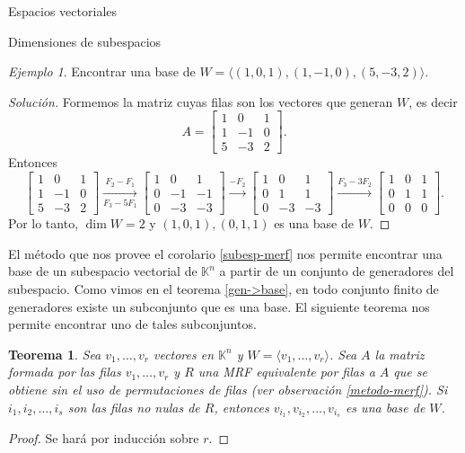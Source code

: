 \documentclass[a4paper,12pt,twoside,spanish,reqno]{amsbook}
\numberwithin{equation}{section}
\newtheorem{teorema}{Teorema}[section]
\theoremstyle{definition}
\theoremstyle{remark}
\newtheorem*{ejemplo*}{Ejemplo}
\newcommand{\K}{\mathbb K}
\begin{document}
\begin{chapter}{Espacios vectoriales}
\begin{section}{Dimensiones de subespacios}
    \begin{ejemplo*}\label{ej-4.5}
        Encontrar una base  de $W= \langle (1,0,1), (1,-1,0), (5,-3,2)\rangle$. 
    \end{ejemplo*}
    \begin{proof}[Solución]
        Formemos la matriz cuyas filas son los vectores que generan $W$,  es decir 
        $$
        A = \begin{bmatrix} 1&0&1 \\ 1&-1&0 \\ 5&-3&2 \end{bmatrix}.
        $$
        Entonces
        \begin{equation*}
        \begin{bmatrix}1&0&1 \\ 1&-1&0 \\ 5&-3&2  \end{bmatrix}
        \underset{F_3-5F_1}{\stackrel{F_2- F_1}{\longrightarrow}} 
        \begin{bmatrix}1&0&1 \\ 0&-1&-1 \\ 0&-3&-3\end{bmatrix}
        \stackrel{-F_2}{\longrightarrow} 
        \begin{bmatrix}1&0&1 \\ 0&1&1 \\ 0&-3&-3\end{bmatrix}
        \stackrel{F_3 - 3F_2}{\longrightarrow}
        \begin{bmatrix}1&0&1 \\ 0&1&1 \\ 0&0&0\end{bmatrix}.
        \end{equation*}
        Por lo tanto, $\dim W =2$ y $(1,0,1), (0,1,1)$ es una base de  $W$.
    \end{proof}
    
    El método que nos provee el corolario  \ref{subesp-merf} nos permite encontrar una base de un subespacio vectorial de $\K^n$ a partir de un conjunto de generadores del subespacio. Como vimos en el teorema \ref{gen->base},  en todo conjunto finito de generadores existe un subconjunto que es una base. El siguiente teorema nos permite encontrar uno de tales subconjuntos. 

    
    \begin{teorema}
        Sea $v_1,\ldots, v_r$ vectores en $\K^n$ y $W = \langle  v_1,\ldots, v_r \rangle$. Sea $A$ la matriz formada por las filas $v_1,\ldots, v_r$ y $R$ una MRF equivalente por filas a $A$ que se obtiene sin el uso de permutaciones de filas (ver observación \ref{metodo-merf}). Si $i_1,i_2,\ldots,i_s$ son las filas no nulas de $R$,  entonces $v_{i_1},v_{i_2},\ldots,v_{i_s}$ es una base de $W$.
    \end{teorema}
    \begin{proof}
        Se hará por inducción sobre $r$. 
        

\end{proof}
\end{section}
\end{chapter}
\end{document}
